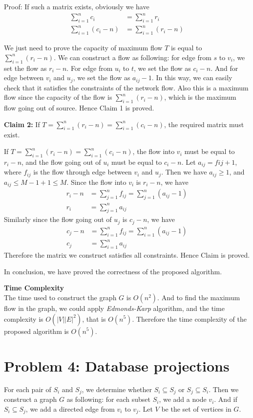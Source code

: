 \documentclass{article}
\newcommand{\Complexity}{\vspace{0.3cm} \noindent\textbf{Time Complexity} \\}
\begin{document}
Proof: If such a matrix exists, obviously we have 
\begin{align}
  \sum_{i=1}^{n}c_i &= \sum_{i=1}^{n}r_i \\
  \sum_{i=1}^{n}(c_i -n) &= \sum_{i=1}^{n}(r_i - n)  
\end{align}

We just need to prove the capacity of maximum flow $T$ is equal to $ \sum_{i=1}^{n}(r_i -n)$.
We can construct a flow as following: for edge from $s$ to $v_i$, we set the flow as $r_i - n$.     
For edge from $u_i$ to $t$, we set the flow as $c_i - n$. And for edge between $v_i$ and $u_j$, we
set the flow as $a_{ij} - 1$. In this way, we can easily check that it satisfies the constraints of
the network flow. Also this is a maximum flow since the capacity of the flow is $\sum_{i=1}^{n}(r_i
- n)$, which is the maximum flow going out of source. Hence Claim 1 is proved.

\textbf{Claim 2:} If $T = \sum_{i=1}^{n} (r_i - n) = \sum_{i=1}^{n}(c_i - n)$, the required
matrix must exist.

If $T = \sum_{i=1}^{n} (r_i - n) = \sum_{i=1}^{n}(c_i -n)$, the flow into $v_i$ must be equal to
$r_i - n$, and the flow going out of $u_i$ must be equal to $c_i - n$. 
Let $a_{ij} = f{ij} + 1$, where $f_{ij}$ is the flow through edge between $v_i$ and $u_j$. Then we
have $a_{ij} \geq 1$, and $a_{ij} \leq M-1 + 1 \leq M$. Since the flow into $v_i$ is $r_i - n$, we
have
\begin{align}
  r_i - n &= \sum_{j=1}^{n}f_{ij} = \sum_{j=1}^{n}(a_{ij} - 1) \\
  r_i &= \sum_{j=1}^{n}a_{ij} 
\end{align}
Similarly since the flow going out of $u_j$ is $c_j - n$, we have 
\begin{align}
  c_j - n &= \sum_{i=1}^{n}f_{ij} = \sum_{i=1}^{n}(a_{ij} - 1) \\
  c_j &= \sum_{i=1}^{n}a_{ij} 
\end{align}
Therefore the matrix we construct satisfies all constraints. Hence Claim is proved.

In conclusion, we have proved the correctness of the proposed algorithm.

\Complexity
The time used to construct the graph $G$ is $O(n^2)$. And to find the maximum flow in the graph, we
could apply \textit{Edmonds-Karp} algorithm, and the time complexity is $O(|V||E|^2)$, that is
$O(n^5)$. Therefore the time complexity of the proposed algorithm is $O(n^5)$.

\section*{Problem 4: Database projections}
For each pair of $S_i$ and $S_j$, we determine whether $S_i \subseteq S_j$ or $S_j \subseteq
S_i$. Then we construct a graph $G$ as following: for each subset $S_i$, we add a node $v_i$. And if $S_i
\subseteq S_j$, we add a directed edge from $v_i$ to $v_j$. Let $V$ be the set of vertices in $G$.
\end{document}
